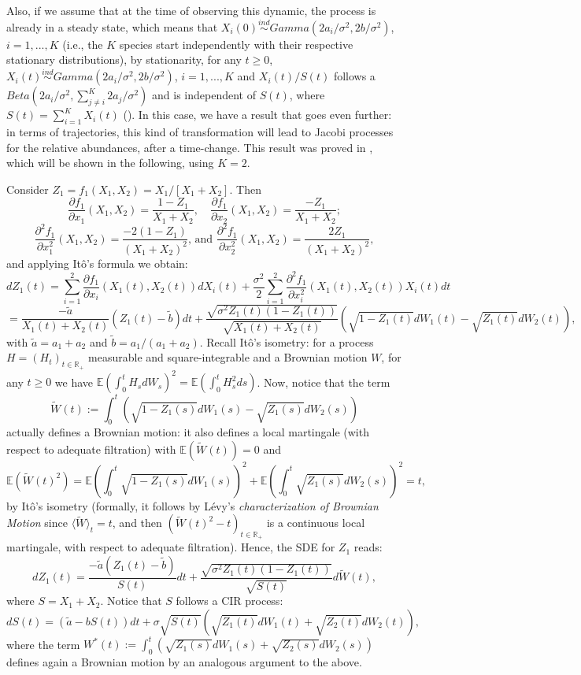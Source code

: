 \documentclass[12pt]{article}
\begin{document}
Also, if we assume that at the time of observing this dynamic, the process is already in a steady state, which means that $X_i(0)\overset{ind}{\sim}Gamma(2a_i/\sigma^2,2b/\sigma^2)$, $i=1, ..., K$ (i.e., the $K$ species start independently with their respective stationary distributions),  by stationarity, for any $t\geq0$, $X_i(t)\overset{ind}{\sim}Gamma(2a_i/\sigma^2,2b/\sigma^2)$, $i=1, ..., K$ and   $X_{i}(t)/S(t)$  follows a $Beta(2a_i/\sigma^2,\sum_{j\neq i}^{K}2a_j/\sigma^2)$ and is independent of $S(t)$, where $S(t)=\sum_{i=1}^KX_i(t)$ (\citep{lukacs1955characterization}).  In this case, we have a result that goes even further: in terms of trajectories, this kind  of transformation will lead to  Jacobi processes for the relative abundances, after a time-change. This result was proved in \citep{gourieroux2006multivariate}, which will be shown in the following, using $K=2$.

Consider $Z_1=f_1(X_1,X_2)=X_1/[X_1+X_2]$. Then 
\[
\frac{\partial f_1}{\partial x_1}(X_1,X_2)=\frac{1-Z_1}{X_1+X_2}, \quad \frac{\partial f_1}{\partial x_2}(X_1,X_2)=\frac{-Z_1}{X_1+X_2};
\]
\[
\frac{\partial^2 f_1}{\partial x_1^2}(X_1,X_2)=\frac{-2(1-Z_1)}{(X_1+X_2)^2}\text{,  and  } \frac{\partial^2 f_1}{\partial x_2^2}(X_1,X_2)=\frac{2Z_1}{(X_1+X_2)^2},
\]
and applying Itô's formula we obtain:
\[
dZ_1(t)=\sum_{i=1}^{2}\frac{\partial f_1}{\partial x_i}(X_1(t),X_2(t))dX_i(t)+\frac{\sigma^2}{2}\sum_{i=1}^{2}\frac{\partial^2 f_1}{\partial x_i^2}(X_1(t),X_2(t))X_i(t)dt
\]
\[
=\frac{-\tilde{a}}{X_1(t)+X_2(t)}(Z_1(t)-\tilde{b})dt+\frac{\sqrt{\sigma^2Z_1(t)(1-Z_1(t))}}{\sqrt{X_1(t)+X_2(t)}}\left(\sqrt{1-Z_1(t)}dW_1(t)-\sqrt{Z_1(t)}dW_2(t)\right),
\]
with $\tilde{a}=a_1+a_2$ and $\tilde{b}=a_1/(a_1+a_2)$. Recall Itô's isometry: for a process $H=(H_t)_{t\in\mathbb{R}_+}$ measurable and square-integrable and a  Brownian motion $W$, for any $t\geq0$ we have $\mathbb{E}\left(\int_{0}^tH_sdW_s\right)^2=\mathbb{E}\left(\int_{0}^tH_s^2ds\right)$. Now, notice that the term \[\tilde{W}(t):=\int_{0}^{t}\left(\sqrt{1-Z_1(s)}dW_1(s)-\sqrt{Z_1(s)}dW_2(s)\right)\] actually defines a Brownian motion: it also defines a local martingale (with respect to adequate filtration)  with $\mathbb{E}\left(\tilde{W}(t)\right)=0$ and  \[\mathbb{E}\left(\tilde{W}(t)^2\right)=\mathbb{E}\left(\int_{0}^t\sqrt{1-Z_1(s)}dW_1(s)\right)^2+\mathbb{E}\left(\int_{0}^t\sqrt{Z_1(s)}dW_2(s)\right)^2=t,\] by Itô's isometry (formally, it follows by Lévy's \textit{characterization of Brownian Motion} since $\langle \tilde{W}\rangle_t=t$, and then $\left(\tilde{W}(t)^2-t\right)_{t\in\mathbb{R}_+}$ is a continuous local martingale, with respect to adequate filtration). Hence, the SDE for $Z_1$ reads:
\[
dZ_1(t)=\frac{-\tilde{a}(Z_1(t)-\tilde{b})}{S(t)}dt+\frac{\sqrt{\sigma^2Z_1(t)(1-Z_1(t))}}{\sqrt{S(t)}}d\tilde{W}(t),
\]
where $S=X_1+X_2$. Notice that  $S$  follows a CIR process:
\[
dS(t)=(\tilde{a}-bS(t))dt+\sigma\sqrt{S(t)}\left(\sqrt{Z_1(t)}dW_1(t)+\sqrt{Z_2(t)}dW_2(t)\right),
\]
where the term $W^*(t):=\int_{0}^{t}\left(\sqrt{Z_1(s)}dW_1(s)+\sqrt{Z_2(s)}dW_2(s)\right)$ defines again a  Brownian motion by an analogous argument to the above. 
\end{document}
